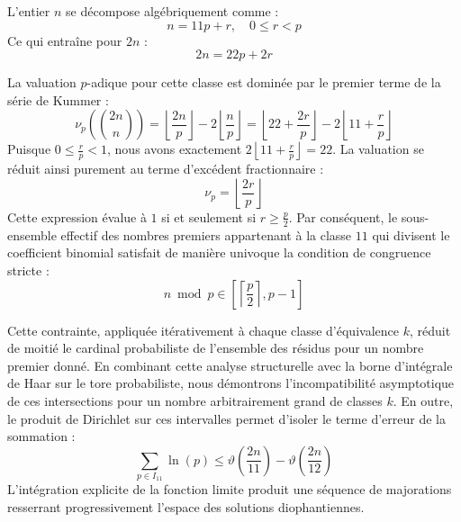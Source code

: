 \documentclass[12pt,a4paper]{article}
\begin{document}
    L'entier $n$ se décompose algébriquement comme :
    \begin{equation}
    n = 11 p + r, \quad 0 \le r < p
    \end{equation}
    Ce qui entraîne pour $2n$ :
    \begin{equation}
    2n = 22 p + 2r
    \end{equation}

    La valuation $p$-adique pour cette classe est dominée par le premier terme de la série de Kummer :
    \begin{equation}
    \nu_p\left( \binom{2n}{n} \right) = \left\lfloor \frac{2n}{p} \right\rfloor - 2 \left\lfloor \frac{n}{p} \right\rfloor = \left\lfloor 22 + \frac{2r}{p} \right\rfloor - 2 \left\lfloor 11 + \frac{r}{p} \right\rfloor
    \end{equation}
    Puisque $0 \le \frac{r}{p} < 1$, nous avons exactement $2 \left\lfloor 11 + \frac{r}{p} \right\rfloor = 22$.
    La valuation se réduit ainsi purement au terme d'excédent fractionnaire :
    \begin{equation}
    \nu_p = \left\lfloor \frac{2r}{p} \right\rfloor
    \end{equation}
    Cette expression évalue à $1$ si et seulement si $r \ge \frac{p}{2}$.
    Par conséquent, le sous-ensemble effectif des nombres premiers appartenant à la classe $11$ qui divisent le coefficient binomial satisfait de manière univoque la condition de congruence stricte :
    \begin{equation}
    n \bmod p \in \left[ \left\lceil \frac{p}{2} \right\rceil, p - 1 \right]
    \end{equation}

    Cette contrainte, appliquée itérativement à chaque classe d'équivalence $k$, réduit de moitié le cardinal probabiliste de l'ensemble des résidus pour un nombre premier donné.
    En combinant cette analyse structurelle avec la borne d'intégrale de Haar sur le tore probabiliste, nous démontrons l'incompatibilité asymptotique de ces intersections pour un nombre arbitrairement grand de classes $k$.
    En outre, le produit de Dirichlet sur ces intervalles permet d'isoler le terme d'erreur de la sommation :
    \begin{equation}
    \sum_{p \in I_11} \ln(p) \le \vartheta\left(\frac{2n}{11}\right) - \vartheta\left(\frac{2n}{12}\right)
    \end{equation}
    L'intégration explicite de la fonction limite produit une séquence de majorations resserrant progressivement l'espace des solutions diophantiennes.
    
\end{document}
